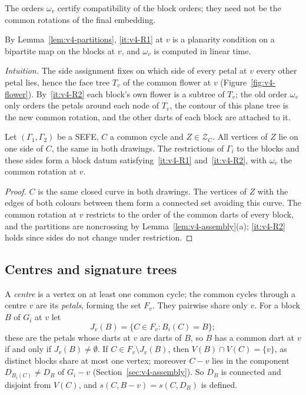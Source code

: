 The orders $\omega_v$ certify compatibility of the block orders; they need
not be the common rotations of the final embedding.

By Lemma~\ref{lem:v4-partitions}, \ref{it:v4-R1} at $v$ is a planarity
condition on a bipartite map on the blocks at $v$, and $\omega_v$ is computed
in linear time.

\emph{Intuition.} The side assignment fixes on which side of every petal at
$v$ every other petal lies, hence the face tree $T_v$ of the common flower at
$v$ (Figure~\ref{fig:v4-flower}). By~\ref{it:v4-R2} each block's own flower
is a subtree of $T_v$; the old order $\omega_v$ only orders the petals around
each node of $T_v$, the contour of this plane tree is the new common
rotation, and the other darts of each block are attached to it.

\begin{lemma}[necessity]\label{lem:v4-necessary}
Let $(\Gamma_1,\Gamma_2)$ be a SEFE, $C$ a common cycle and $Z\in\mathcal
Z_C$. All vertices of $Z$ lie on one side of $C$, the same in both drawings.
The restrictions of $\Gamma_i$ to the blocks and these sides form a block
datum satisfying~\ref{it:v4-R1} and~\ref{it:v4-R2}, with $\omega_v$ the
common rotation at $v$.
\end{lemma}

\begin{proof}
$C$ is the same closed curve in both drawings. The vertices of $Z$ with the
edges of both colours between them form a connected set avoiding this
curve. The common rotation at $v$ restricts to the order of the common
darts of every block, and the partitions are noncrossing by
Lemma~\ref{lem:v4-assembly}(a); \ref{it:v4-R2} holds since sides do not
change under restriction.
\end{proof}

\subsection{Centres and signature trees}\label{sec:v4-sigtree}

A \emph{centre} is a vertex on at least one common cycle; the common cycles
through a centre $v$ are its \emph{petals}, forming the set $F_v$. They
pairwise share only $v$. For a block $B$ of $G_i$ at $v$ let
\[
J_v(B)=\{C\in F_v: B_i(C)=B\};
\]
these are the petals whose darts at $v$ are darts of $B$, so $B$ has a
common dart at $v$ if and only if $J_v(B)\neq\emptyset$. If $C\in F_v\setminus
J_v(B)$, then $V(B)\cap V(C)=\{v\}$, as distinct blocks share at most one
vertex; moreover $C-v$ lies in the component $D_{B_i(C)}\neq D_B$ of $G_i-v$
(Section~\ref{sec:v4-assembly}). So $D_B$ is connected and disjoint from
$V(C)$, and $s(C,B-v)=s(C,D_B)$ is defined.

